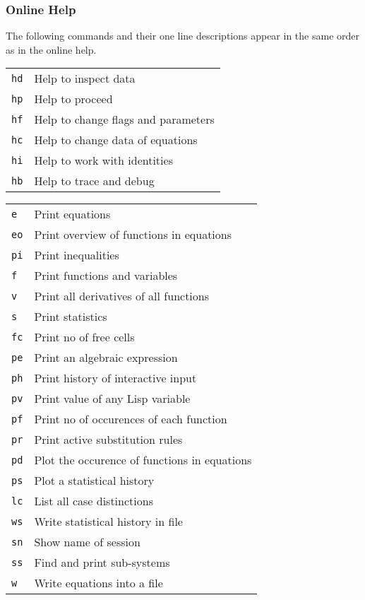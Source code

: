 \subsubsection{Online Help}

The following commands and their one line descriptions appear in the
same order as in the online help.


\begin{longtable}[l]{ll}
  \texttt{hd} & Help to inspect data \\
  \texttt{hp} & Help to proceed \\
  \texttt{hf} & Help to change flags and parameters \\
  \texttt{hc} & Help to change data of equations \\
  \texttt{hi} & Help to work with identities \\
  \texttt{hb} & Help to trace and debug
\end{longtable}


\begin{longtable}[l]{ll}
  \texttt{e}  & Print equations \\
  \texttt{eo} & Print overview of functions in equations \\
  \texttt{pi} & Print inequalities \\
  \texttt{f}  & Print functions and variables \\
  \texttt{v}  & Print all derivatives of all functions \\
  \texttt{s}  & Print statistics \\
  \texttt{fc} & Print no of free cells \\
  \texttt{pe} & Print an algebraic expression \\
  \texttt{ph} & Print history of interactive input \\
  \texttt{pv} & Print value of any Lisp variable \\
  \texttt{pf} & Print no of occurences of each function \\
  \texttt{pr} & Print active substitution rules \\
  \texttt{pd} & Plot the occurence of functions in equations \\
  \texttt{ps} & Plot a statistical history \\
  \texttt{lc} & List all case distinctions \\
  \texttt{ws} & Write statistical history in file \\
  \texttt{sn} & Show name of session \\
  \texttt{ss} & Find and print sub-systems \\
  \texttt{w}  & Write equations into a file
\end{longtable}

